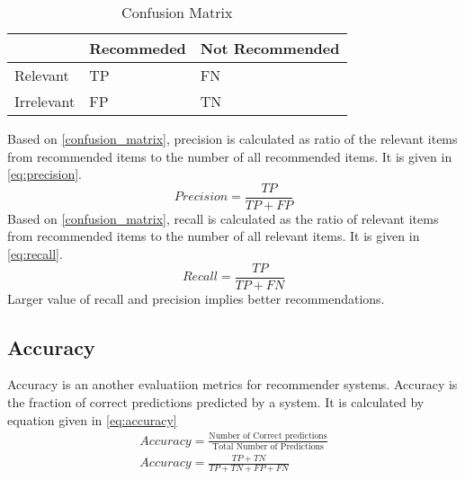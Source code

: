 \begin{table}[]
\centering 
\begin{tabular}{|l|l|l|}
\hline
\rowcolor[HTML]{C0C0C0} 
\textbf{}  & \textbf{Recommeded} & \textbf{Not Recommended} \\ \hline
Relevant   & TP                  & FN                       \\ \hline
Irrelevant & FP                  & TN                       \\ \hline
\end{tabular}
\caption{Confusion Matrix \cite{21}}
\label{confusion_matrix}
\end{table}
\noindent Based on \autoref{confusion_matrix}, precision is calculated as ratio of the relevant items from recommended items to the number of all recommended items. It is given in \autoref{eq:precision}. 
\begin{equation}
Precision = \frac{TP}{TP + FP} 
\label{eq:precision}
\end{equation}
\noindent Based on \autoref{confusion_matrix}, recall is calculated as the ratio of relevant items from recommended items to the number of all relevant items. It is given in \autoref{eq:recall}. 
\begin{equation}
Recall = \frac{TP}{TP + FN} 
\label{eq:recall}
\end{equation}
Larger value of recall and precision implies better recommendations.

\subsection{Accuracy}
\label{sec:accuracy}
Accuracy is an another evaluatiion metrics for recommender systems. Accuracy is the fraction of correct predictions predicted by a system. It is calculated by equation given in \autoref{eq:accuracy}
\begin{align}
Accuracy = \frac{\textrm{Number of Correct predictions}}{\textrm{Total Number of Predictions}} \\
Accuracy = \frac{TP + TN }{TP + TN + FP + FN}
\label{eq:accuracy}
\end{align}

